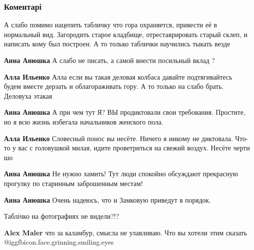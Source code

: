  
 
 
 
 
\subsubsection{Коментарі}

\begin{itemize} %

А слабо помимо нацепить табличку что гора охраняется, привести её в нормальный
вид. Загородить старое кладбище, отреставрировать старый склеп, и написать кому
был построен. А то только таблички научились тыкать везде

\begin{itemize} %
\textbf{Анна Анюшка} А слабо не писать, а самой внести посильный вклад ?

\begin{itemize} %
\textbf{Алла Ильенко} Алла если вы такая деловая колбаса давайте подтягивайтесь будем вместе дерзать и облагораживать гору. А то только на слабо брать. Деловуха этакая

\textbf{Анна Анюшка} А при чем тут Я? ВЫ продиктовали свои требования. Простите, но я всю жизнь избегала начальников женского пола.

\textbf{Алла Ильенко} Словесный понос вы несёте. Ничего я никому не диктовала. Что-то у вас с головушкой милая, идите проветриться на свежий воздух. Несёте черти шо

\textbf{Анна Анюшка} Не нужно хамить! Тут люди спокойно обсуждают прекрасную прогулку по старинным заброшенным местам!
\end{itemize} %

\textbf{Анна Анюшка} Очень надеюсь, что и Замковую приведут в порядок.

Таблічко на фотографиях не видели?!?

\begin{itemize} %
\textbf{Alex Maler} что за каламбур, смысла не улавливаю. Что вы хотели этим сказать @igg{fbicon.face.grinning.smiling.eyes} 


\end{itemize}
\end{itemize}
\end{itemize}
